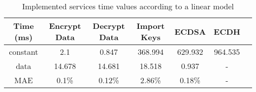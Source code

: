 \begin{table}[h!]
\centering
\def\arraystretch{1.5}
\begin{tabular}{|c|c|c|c|c|c|c|}
\hline
	Time (ms) & Encrypt Data  & Decrypt Data  & Import Keys & ECDSA & ECDH   \\ \hline
	constant  & 2.1    & 0.847  & 368.994  & 629.932 & 964.535 \\ \hline
	data      & 14.678 & 14.681 & 18.518 & 0.937 & - \\ \hline
	MAE	  & 0.1\% & 0.12\%  & 2.86\% & 0.18\% & - \\ \hline
\end{tabular}
\caption{Implemented services time values according to a linear model}
\label{tab:services-model}
\end{table}

